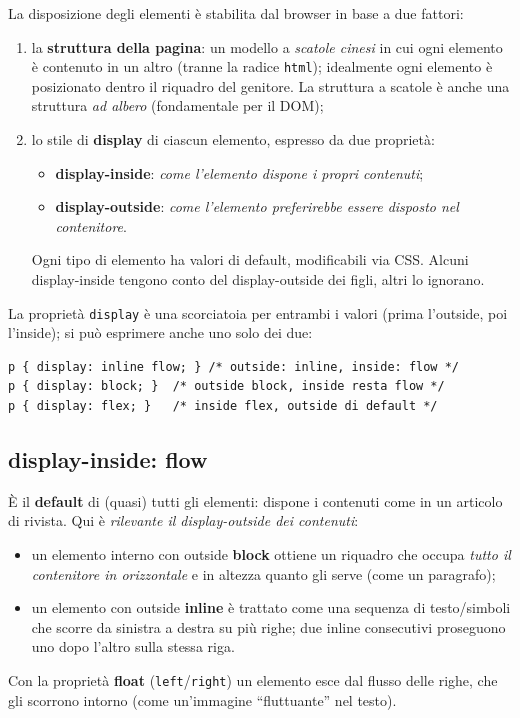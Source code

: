 La disposizione degli elementi \`e stabilita dal browser in base a due fattori:
\begin{enumerate}
  \item la \textbf{struttura della pagina}: un modello a \emph{scatole cinesi} in cui ogni
        elemento \`e contenuto in un altro (tranne la radice \texttt{html}); idealmente ogni
        elemento \`e posizionato dentro il riquadro del genitore. La struttura a scatole \`e
        anche una struttura \emph{ad albero} (fondamentale per il DOM);
  \item lo stile di \textbf{display} di ciascun elemento, espresso da due propriet\`a:
        \begin{itemize}
          \item \textbf{display-inside}: \emph{come l'elemento dispone i propri contenuti};
          \item \textbf{display-outside}: \emph{come l'elemento preferirebbe essere disposto
                nel contenitore}.
        \end{itemize}
        Ogni tipo di elemento ha valori di default, modificabili via CSS. Alcuni
        display-inside tengono conto del display-outside dei figli, altri lo ignorano.
\end{enumerate}

La propriet\`a \texttt{display} \`e una scorciatoia per entrambi i valori (prima l'outside,
poi l'inside); si pu\`o esprimere anche uno solo dei due:
\begin{lstlisting}[language=HTMLCSS]
p { display: inline flow; } /* outside: inline, inside: flow */
p { display: block; }  /* outside block, inside resta flow */
p { display: flex; }   /* inside flex, outside di default */
\end{lstlisting}

\subsection{display-inside: flow}
\`E il \textbf{default} di (quasi) tutti gli elementi: dispone i contenuti come in un articolo
di rivista. Qui \`e \emph{rilevante il display-outside dei contenuti}:
\begin{itemize}
  \item un elemento interno con outside \textbf{block} ottiene un riquadro che occupa
        \emph{tutto il contenitore in orizzontale} e in altezza quanto gli serve (come un
        paragrafo);
  \item un elemento con outside \textbf{inline} \`e trattato come una sequenza di testo/simboli
        che scorre da sinistra a destra su pi\`u righe; due inline consecutivi proseguono uno
        dopo l'altro sulla stessa riga.
\end{itemize}
Con la propriet\`a \textbf{float} (\texttt{left}/\texttt{right}) un elemento esce dal flusso
delle righe, che gli scorrono intorno (come un'immagine ``fluttuante'' nel testo).

